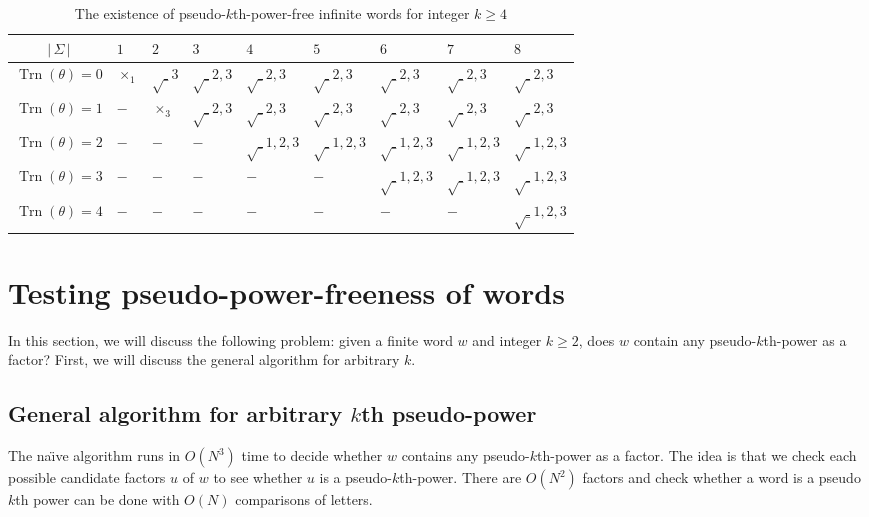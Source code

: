 \documentclass[12pt]{article}
\def\abs#1{{|\,#1\,|}}
\def\tr{{\operatorname{Trn}}}
\begin{document}
\begin{table}
\centering \caption{The existence of pseudo-$k$th-power-free
infinite words for integer $k\geq 4$}
\begin{tabular}{c|p{5.5ex}p{5.5ex}p{5.5ex}p{5.5ex}p{5.5ex}p{5.5ex}p{5.5ex}p{5.5ex}}
  \hline
$\abs{\Sigma}$ & $1$ & $2$ & $3$ & $4$ & $5$ & $6$ & $7$ & $8$ \\
  \hline
  $\tr(\theta)=0$ & $\times_{1}$ & $\surd_{3}$ & $\surd_{2,3}$ & $\surd_{2,3}$ & $\surd_{2,3}$ & $\surd_{2,3}$ & $\surd_{2,3}$ & $\surd_{2,3}$ \\
  $\tr(\theta)=1$ & $-$ & $\times_{3}$ & $\surd_{2,3}$ & $\surd_{2,3}$ & $\surd_{2,3}$ & $\surd_{2,3}$ & $\surd_{2,3}$ & $\surd_{2,3}$ \\
  $\tr(\theta)=2$ & $-$ & $-$ & $-$ & $\surd_{1,2,3}$ & $\surd_{1,2,3}$ & $\surd_{1,2,3}$ & $\surd_{1,2,3}$ & $\surd_{1,2,3}$ \\
  $\tr(\theta)=3$ & $-$ & $-$ & $-$ & $-$ & $-$ & $\surd_{1,2,3}$ & $\surd_{1,2,3}$ & $\surd_{1,2,3}$ \\
  $\tr(\theta)=4$ & $-$ & $-$ & $-$ & $-$ & $-$ & $-$ & $-$ & $\surd_{1,2,3}$ \\
  \hline
\end{tabular}\label{table:pseudoforth}
\end{table}



\section{Testing pseudo-power-freeness of words}\label{section:decision}
In this section, we will discuss the following problem: given a
finite word $w$ and integer $k\geq 2$, does $w$ contain any
pseudo-$k$th-power as a factor? First, we will discuss the general
algorithm for arbitrary $k$.


\subsection{General algorithm for arbitrary $k$th pseudo-power}
The na\"\i ve algorithm runs in $O(N^3)$ time to decide whether $w$
contains any pseudo-$k$th-power as a factor. The idea is that we
check each possible candidate factors $u$ of $w$ to see whether $u$
is a pseudo-$k$th-power. There are $O(N^2)$ factors and check
whether a word is a pseudo $k$th power can be done with $O(N)$
comparisons of letters.
\end{document}
